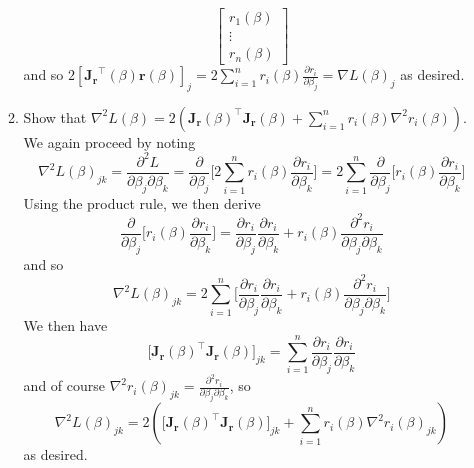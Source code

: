 \documentclass{article}
\begin{document}
\begin{enumerate}[label=\arabic*.]
\begin{enumerate}[label=(\alph*)]
{$$\begin{bmatrix}
  r_1(\beta) \\
  \vdots \\
  r_n(\beta)
  \end{bmatrix}
$$
and so $2[\mathbf{J_r}^\top(\beta)\mathbf{r}(\beta)]_j = 2\sum_{i=1}^n r_i(\beta)\frac{\partial r_i}{\partial\beta_j} = \nabla L(\beta)_j$ as desired.}
\item Show that $\nabla^2 L(\beta) = 2(\mathbf{J_r}(\beta)^\top\mathbf{J_r}(\beta) + \sum_{i=1}^n r_i(\beta) \nabla^2 r_i(\beta))$. \\
{\color{blue} We again proceed by noting
$$\nabla^2 L(\beta)_{jk} = \frac{\partial^2 L}{\partial\beta_j\partial\beta_k} = \frac{\partial}{\partial \beta_j}\big[2\sum_{i=1}^n r_i(\beta)\frac{\partial r_i}{\partial \beta_k}\big] = 2\sum_{i=1}^n \frac{\partial}{\partial\beta_j}\big[r_i(\beta)\frac{\partial r_i}{\partial\beta_k}\big]$$
Using the product rule, we then derive
$$\frac{\partial}{\partial\beta_j}\big[r_i(\beta)\frac{\partial r_i}{\partial\beta_k}\big] = \frac{\partial r_i}{\partial\beta_j}\frac{\partial r_i}{\partial\beta_k} + r_i(\beta)\frac{\partial^2 r_i}{\partial \beta_j \partial \beta_k}$$
and so $$\nabla^2 L(\beta)_{jk} = 2\sum_{i=1}^n \big[\frac{\partial r_i}{\partial\beta_j}\frac{\partial r_i}{\partial\beta_k} + r_i(\beta)\frac{\partial^2 r_i}{\partial \beta_j \partial \beta_k}\big] $$
We then have $$\big[\mathbf{J_r}(\beta)^\top\mathbf{J_r}(\beta)\big]_{jk} = \sum_{i=1}^n \frac{\partial r_i}{\partial\beta_j}\frac{\partial r_i}{\partial\beta_k}$$
and of course $\nabla^2 r_i(\beta)_{jk} = \frac{\partial^2 r_i}{\partial \beta_j \partial \beta_k}$, so $$\nabla^2 L(\beta)_{jk} = 2(\big[\mathbf{J_r}(\beta)^\top\mathbf{J_r}(\beta)\big]_{jk} + \sum_{i=1}^n r_i(\beta)\nabla^2r_i(\beta)_{jk})$$ as desired.}
\end{enumerate}
\end{enumerate}
\end{document}
